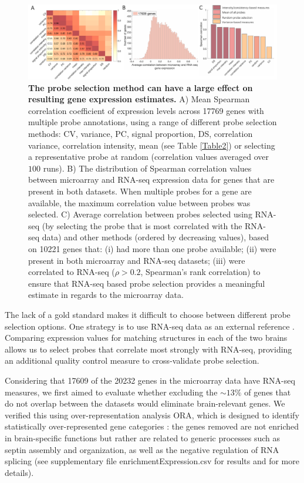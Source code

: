 \documentclass[10pt,A4]{article}
\begin{document}
\begin{figure}[h!]
  \centering
    \includegraphics[width=1\textwidth]{Ch4Fig4.pdf}
\caption{\textbf{The probe selection method can have a large effect on resulting gene expression estimates.}
A) Mean Spearman correlation coefficient of expression levels across \num{17769} genes with multiple probe annotations, using a range of different probe selection methods: CV, variance, PC, signal proportion, DS, correlation variance, correlation intensity, mean (see Table \ref{Table2}) or selecting a representative probe at random (correlation values averaged over $100$ runs).
B) The distribution of Spearman correlation values between microarray and RNA-seq expression data for genes that are present in both datasets. When multiple probes for a gene are available, the maximum correlation value between probes was selected.
C) Average correlation between probes selected using RNA-seq (by selecting the probe that is most correlated with the RNA-seq data) and other methods (ordered by decreasing values), based on \num{10221} genes that: (i) had more than one probe available; (ii) were present in both microarray and RNA-seq datasets; (iii) were correlated to RNA-seq ($\rho > 0.2$, Spearman’s rank correlation) to ensure that RNA-seq based probe selection provides a meaningful estimate in regards to the microarray data.}
\label{fig:Ch4Fig4}
\end{figure}

The lack of a gold standard makes it difficult to choose between different probe selection options. One strategy is to use RNA-seq data as an external reference \citep{Miller2014a}. Comparing expression values for matching structures in each of the two brains allows us to select probes that correlate most strongly with RNA-seq, providing an additional quality control measure to cross-validate probe selection.

Considering that \num{17609} of the \num{20232} genes in the microarray data have RNA-seq measures, we first aimed to evaluate whether excluding the $\sim13\%$ of genes that do not overlap between the datasets would eliminate brain-relevant genes. We verified this using over-representation analysis ORA, which is designed to identify statistically over-represented gene categories \citep{Gillis2010}: the genes removed are not enriched in brain-specific functions but rather are related to generic processes such as septin assembly and organization, as well as the negative regulation of RNA splicing (see supplementary file enrichmentExpression.csv for results and  for more details).
\end{document}
